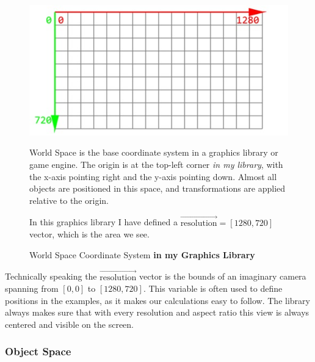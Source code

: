 \begin{figure}[h]
    \centering
    \begin{minipage}[b]{0.4\textwidth}
        \includegraphics[width=\linewidth]{img/world-space.jpg}
        \caption{World Space Coordinate System \textbf{in my Graphics Library}}
    \end{minipage}\hfill
    \begin{minipage}[b]{0.55\textwidth}
        \setlength{\parskip}{1em}
        \setlength{\parindent}{0pt}
        World Space is the base coordinate system in a graphics library or game engine. The origin is at the top-left corner \textit{in my library}, with the x-axis pointing right and the y-axis pointing down. Almost all objects are positioned in this space, and transformations are applied relative to the origin.

        In this graphics library I have defined a \(\vec{\text{resolution}}=[1280, 720]\) vector, which is the area we see. 
    \end{minipage}
\end{figure}

\begin{Note}
    Technically speaking the \(\vec{\text{resolution}}\) vector is the bounds of an imaginary camera spanning from \([0, 0]\) to \([1280, 720]\). This variable is often used to define positions in the examples, as it makes our calculations easy to follow. The library always makes sure that with every resolution and aspect ratio this view is always centered and visible on the screen.
\end{Note}

\pagebreak

\subsubsection{Object Space}
\label{sec:object-space}

